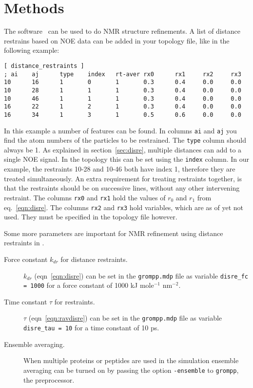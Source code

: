 \documentclass[11pt,dvips]{article}
\begin{document}
\section{Methods}
The {\gromacs} software~\cite{Berendsen95a,gmx2} 
can be used to do NMR structure refinements.
A list of distance restrains based on NOE data can be added in your
topology file, like in the following example:
\begin{verbatim}
[ distance_restraints ]
; ai    aj      type    index   rt-aver rx0      rx1     rx2     rx3
10      16      1       0       1       0.3      0.4     0.0     0.0 
10      28      1       1       1       0.3      0.4     0.0     0.0 
10      46      1       1       1       0.3      0.4     0.0     0.0 
16      22      1       2       1       0.3      0.4     0.0     0.0 
16      34      1       3       1       0.5      0.6     0.0     0.0 
\end{verbatim}
In this example a number of features can be found.
In columns {\tt ai} and {\tt aj} you find the atom numbers of the
particles to be restrained. The {\tt type} column should always be 1.
As explained in section~\ref{sec:disre}, multiple distances can add
to a single NOE signal. In the topology this can be set using the
{\tt index} column. In our example, the restraints 10-28 and 10-46
both have index 1, therefore they are treated simultaneously.
An extra requirement for treating restraints together, is that 
the restraints should be on successive lines, without any
other intervening restraint. The columns {\tt rx0} and {\tt rx1} hold
the values of $r_0$ and $r_1$ from eq.~\ref{eqn:disre}.
The columns {\tt rx2} and {\tt rx3} hold variables, which are as of yet 
not used. They must be specified in the topology file however.

Some more parameters are important for NMR refinement using
distance restraints in {\gromacs}.
\begin{description}
\item[Force constant $k_{dr}$ for distance restraints.] 
	$k_{dr}$  (eqn~\ref{eqn:disre}) can be set in the {\tt grompp.mdp} file
	as variable {\tt disre\_fc = 1000} for a force constant of
	1000 {kJ mole$^{-1}$ nm$^{-2}$}.
\item[Time constant $\tau$ for restraints.] 
	$\tau$ (eqn~\ref{eqn:ravdisre}) can be set in the {\tt grompp.mdp} file
	as variable {\tt disre\_tau = 10} for a time constant of
	10 ps.
\item[Ensemble averaging.] When multiple proteins or peptides are used
	in the simulation ensemble averaging 
	can be turned on by passing the option
	{\tt -ensemble} to {\tt grompp}, the {\gromacs}
	preprocessor.
\end{description}
\end{document}
